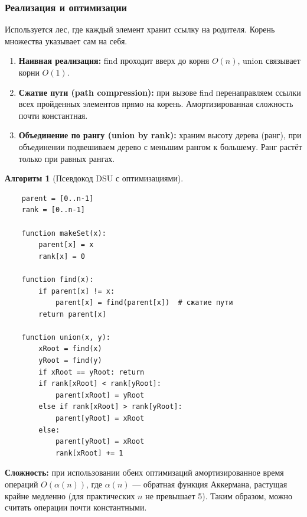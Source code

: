 \documentclass[12pt]{article}
\newtheorem{algorithm}{Алгоритм}
\begin{document}
\begin{enumerate}
\subsubsection{Реализация и оптимизации}
Используется лес, где каждый элемент хранит ссылку на родителя. Корень множества указывает сам на себя.

\begin{enumerate}
    \item \textbf{Наивная реализация:} find проходит вверх до корня \(O(n)\), union связывает корни \(O(1)\).
    \item \textbf{Сжатие пути (path compression):} при вызове find перенаправляем ссылки всех пройденных элементов прямо на корень. Амортизированная сложность почти константная.
    \item \textbf{Объединение по рангу (union by rank):} храним высоту дерева (ранг), при объединении подвешиваем дерево с меньшим рангом к большему. Ранг растёт только при равных рангах.
\end{enumerate}

\begin{algorithm}[Псевдокод DSU с оптимизациями]
    \begin{verbatim}
    parent = [0..n-1]
    rank = [0..n-1]
    
    function makeSet(x):
        parent[x] = x
        rank[x] = 0
    
    function find(x):
        if parent[x] != x:
            parent[x] = find(parent[x])  # сжатие пути
        return parent[x]
    
    function union(x, y):
        xRoot = find(x)
        yRoot = find(y)
        if xRoot == yRoot: return
        if rank[xRoot] < rank[yRoot]:
            parent[xRoot] = yRoot
        else if rank[xRoot] > rank[yRoot]:
            parent[yRoot] = xRoot
        else:
            parent[yRoot] = xRoot
            rank[xRoot] += 1
    \end{verbatim}
\end{algorithm}

\textbf{Сложность:} при использовании обеих оптимизаций амортизированное время операций \(O(\alpha(n))\), где \(\alpha(n)\) — обратная функция Аккермана, растущая крайне медленно (для практических \(n\) не превышает 5). Таким образом, можно считать операции почти константными.


\end{enumerate}
\end{document}
